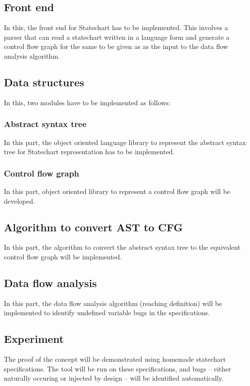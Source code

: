 \documentclass[12pt, a4paper]{article}
\begin{document}
\subsection{Front end}
In this, the front end for Statechart has to be implemented. This involves a parser that can read a statechart written in a language form and generate a control flow graph for the same to be given as as the input to the data flow analysis algorithm.

\subsection{Data structures}
In this, two modules have to be implemented as follows:


\subsubsection{Abstract syntax tree}
In this part, the object oriented language library to represent the abstract syntax tree for Statechart representation has to be implemented.

\subsubsection{Control flow graph}
In this part, object oriented library to represent a control flow graph will be developed.

\subsection{Algorithm to convert AST to CFG}
In this part, the algorithm to convert the abstract syntax tree to the equivalent control flow graph will be implemented.

\subsection{Data flow analysis}
In this part, the data flow analysis algorithm (reaching definition) will be implemented to identify undefined variable bugs in the specifications.

\subsection{Experiment}
The proof of the concept will be demonstrated using homemade statechart specifications. The tool will be run on these specifications, and bugs -- either naturally occuring or injected by design -- will be identified automatically.
\end{document}
